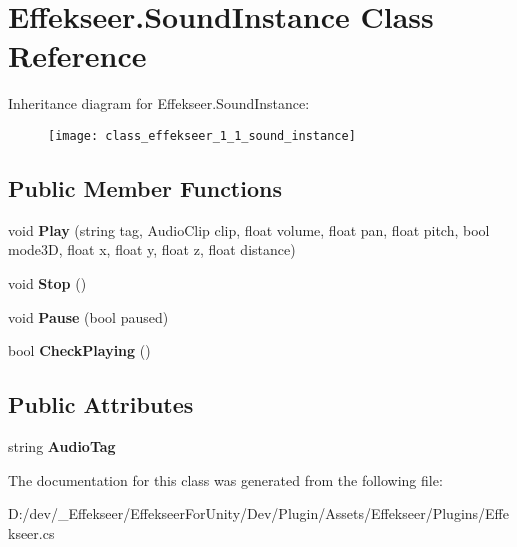 \hypertarget{class_effekseer_1_1_sound_instance}{}\section{Effekseer.\+Sound\+Instance Class Reference}
\label{class_effekseer_1_1_sound_instance}
Inheritance diagram for Effekseer.\+Sound\+Instance\+:\begin{figure}[H]
\begin{center}
\leavevmode
\texttt{[image: class\_effekseer\_1\_1\_sound\_instance]}
\end{center}
\end{figure}
\subsection*{Public Member Functions}
\begin{DoxyCompactItemize}
\item 
\mbox{\label{class_effekseer_1_1_sound_instance_a0dad13c99eec9f7fd3a254da889d41b0}} 
void {\bfseries Play} (string tag, Audio\+Clip clip, float volume, float pan, float pitch, bool mode3D, float x, float y, float z, float distance)
\item 
\mbox{\label{class_effekseer_1_1_sound_instance_a47120b96077ba0222ba7dcaac289947f}} 
void {\bfseries Stop} ()
\item 
\mbox{\label{class_effekseer_1_1_sound_instance_a8bea651d2b06d9f9cf4cefc97a9f7226}} 
void {\bfseries Pause} (bool paused)
\item 
\mbox{\label{class_effekseer_1_1_sound_instance_aba66c6f052a23feff462c6ceebd09b2e}} 
bool {\bfseries Check\+Playing} ()
\end{DoxyCompactItemize}
\subsection*{Public Attributes}
\begin{DoxyCompactItemize}
\item 
\mbox{\label{class_effekseer_1_1_sound_instance_aaecb9b470d568fa58a7b89d9b8374e65}} 
string {\bfseries Audio\+Tag}
\end{DoxyCompactItemize}


The documentation for this class was generated from the following file\+:\begin{DoxyCompactItemize}
\item 
D\+:/dev/\+\_\+\+Effekseer/\+Effekseer\+For\+Unity/\+Dev/\+Plugin/\+Assets/\+Effekseer/\+Plugins/Effekseer.\+cs\end{DoxyCompactItemize}
